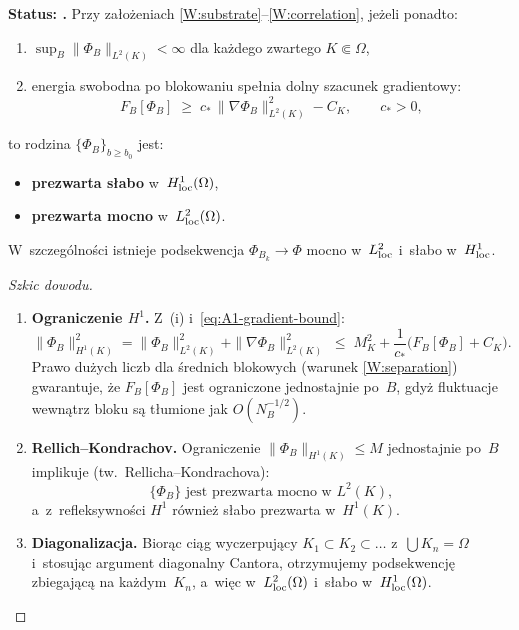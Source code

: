 \begin{lemma}%
\label{lem:A1-compactness}
\textbf{Status: .}
Przy za\l{}o\.zeniach \ref{W:substrate}--\ref{W:correlation},
je\.zeli ponadto:
\begin{enumerate}[nosep]
  \item[(i)] $\sup_B \|\Phi_B\|_{L^2(K)} < \infty$
    dla ka\.zdego zwartego $K \Subset \Omega$,
  \item[(ii)] energia swobodna po blokowaniu spe\l{}nia dolny szacunek
    gradientowy:
    \begin{equation}
      F_B[\Phi_B] \;\ge\; c_*\,\|\nabla\Phi_B\|^2_{L^2(K)} - C_K,
      \qquad c_* > 0,
      \label{eq:A1-gradient-bound}
    \end{equation}
\end{enumerate}
to rodzina $\{\Phi_B\}_{b \ge b_0}$ jest:
\begin{itemize}[nosep]
  \item \textbf{prezwarta s\l{}abo} w~$H^1_{\rm loc}(\Omega)$,
  \item \textbf{prezwarta mocno} w~$L^2_{\rm loc}(\Omega)$.
\end{itemize}
W~szczeg\'olno\'sci istnieje podsekwencja $\Phi_{B_k} \to \Phi$
mocno w~$L^2_{\rm loc}$ i~s\l{}abo w~$H^1_{\rm loc}$.
\end{lemma}

\begin{proof}[Szkic dowodu]
\begin{enumerate}[nosep]
  \item \textbf{Ograniczenie $H^1$.}
    Z~(i) i~\eqref{eq:A1-gradient-bound}:
    \[
      \|\Phi_B\|_{H^1(K)}^2
      = \|\Phi_B\|_{L^2(K)}^2 + \|\nabla\Phi_B\|_{L^2(K)}^2
      \;\le\; M_K^2 + \frac{1}{c_*}\bigl(F_B[\Phi_B] + C_K\bigr).
    \]
    Prawo du\.zych liczb dla \'srednich blokowych (warunek \ref{W:separation})
    gwarantuje, \.ze $F_B[\Phi_B]$ jest ograniczone jednostajnie po~$B$,
    gdy\.z fluktuacje wewn\k{a}trz bloku s\k{a} t\l{}umione jak $O(N_B^{-1/2})$.

  \item \textbf{Rellich--Kondrachov.}
    Ograniczenie $\|\Phi_B\|_{H^1(K)} \le M$ jednostajnie po~$B$
    implikuje (tw.~Rellicha--Kondrachova):
    \[
      \{\Phi_B\} \text{ jest prezwarta mocno w } L^2(K),
    \]
    a~z~refleksywno\'sci $H^1$ r\'ownie\.z s\l{}abo prezwarta w~$H^1(K)$.

  \item \textbf{Diagonalizacja.}
    Bior\k{a}c ci\k{a}g wyczerpuj\k{a}cy $K_1 \subset K_2 \subset \ldots$
    z~$\bigcup K_n = \Omega$ i~stosuj\k{a}c argument diagonalny Cantora,
    otrzymujemy podsekwencj\k{e} zbiegaj\k{a}c\k{a} na ka\.zdym~$K_n$,
    a~wi\k{e}c w~$L^2_{\rm loc}(\Omega)$ i~s\l{}abo w~$H^1_{\rm loc}(\Omega)$.\qedhere
\end{enumerate}
\end{proof}

